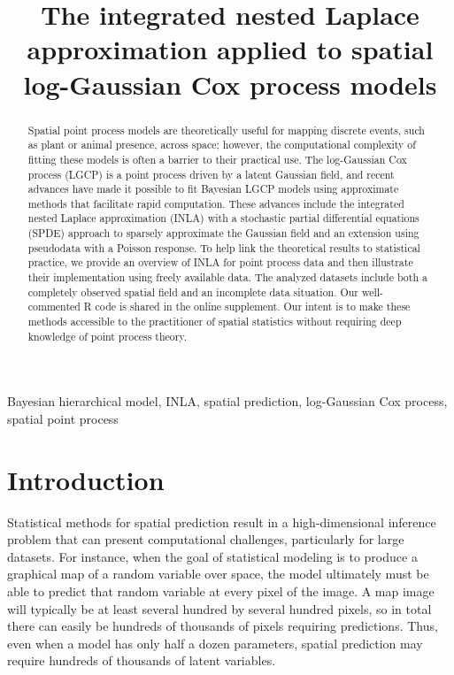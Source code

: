 \documentclass[]{interact}
\begin{document}

\title{The integrated nested Laplace approximation applied to spatial log-Gaussian Cox process models}

\author{
}

\maketitle

\begin{abstract}
Spatial point process models are theoretically useful for mapping discrete
events, such as plant or animal presence, across space; however, the computational
complexity of fitting these models is often a barrier to their practical use.
The log-Gaussian Cox process (LGCP) is a point process driven by a latent
Gaussian field, and recent advances have made it possible to fit Bayesian LGCP
models using approximate methods that facilitate rapid computation. These advances
include the integrated nested Laplace approximation (INLA) with a
stochastic partial differential equations (SPDE) approach to
sparsely approximate the Gaussian field and an extension using pseudodata with
a Poisson response. To help link the theoretical results to statistical
practice, we provide an overview of INLA for point process data 
and then illustrate their implementation using freely available data. 
The analyzed datasets include both a completely observed spatial field
 and an incomplete data situation. Our well-commented R
code is shared in the online supplement. Our intent is to make these methods
accessible to the practitioner of spatial statistics without requiring deep
knowledge of point process theory.
\end{abstract}

\begin{keywords}
Bayesian hierarchical model, INLA, spatial prediction, log-Gaussian Cox process, spatial point process
\end{keywords}


\section{Introduction}
\label{intro}

Statistical methods for spatial prediction result in a high-dimensional
inference problem that can present computational challenges, particularly for
large datasets. For instance, when the goal of statistical modeling is to
produce a graphical map of a random variable over space, the model ultimately
must be able to predict that random variable at every pixel of the image. A map
image will typically be at least several hundred by several hundred pixels, so
in total there can easily be hundreds of thousands of pixels requiring
predictions. Thus, even when a model has only half a dozen parameters, spatial
prediction may require hundreds of thousands of latent variables.
\end{document}
